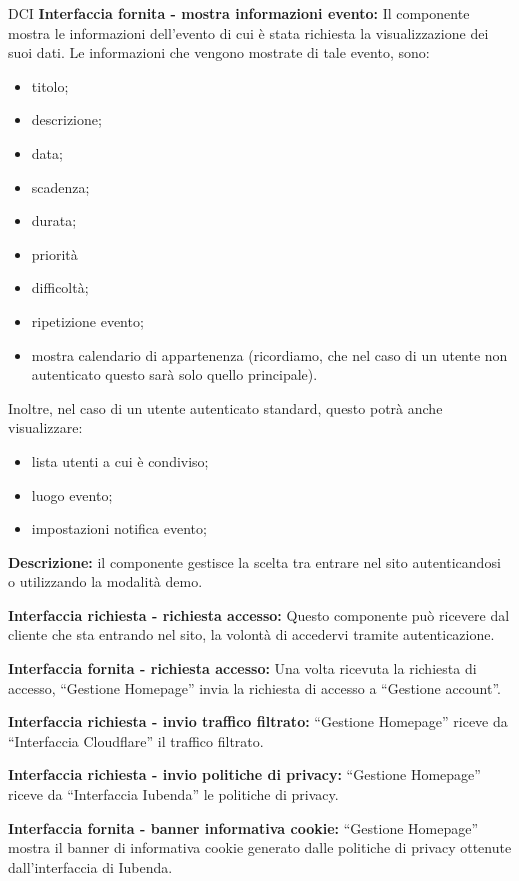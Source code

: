 \begin{listaPersonale}{DCI}
    \textbf{Interfaccia fornita - mostra informazioni evento:} Il componente mostra le informazioni dell'evento di cui è stata richiesta la visualizzazione dei suoi dati. Le informazioni che vengono mostrate di tale evento, sono:
    \begin{itemize}
        \item titolo;
        \item descrizione;
        \item data;
        \item scadenza;
        \item durata;
        \item priorità
        \item difficoltà;
        \item ripetizione evento;
        \item mostra calendario di appartenenza (ricordiamo, che nel caso di un utente non autenticato questo sarà solo quello principale).
    \end{itemize}
    Inoltre, nel caso di un utente autenticato standard, questo potrà anche visualizzare:
    \begin{itemize}
        \item lista utenti a cui è condiviso;
        \item luogo evento;
        \item impostazioni notifica evento;
    \end{itemize}



    \textbf{Descrizione:} il componente gestisce la scelta tra entrare nel sito autenticandosi o utilizzando la modalità demo.

    \textbf{Interfaccia richiesta - richiesta accesso:} Questo componente può ricevere dal cliente che sta entrando nel sito, la volontà di accedervi tramite autenticazione.

    \textbf{Interfaccia fornita - richiesta accesso:} Una volta ricevuta la richiesta di accesso, “Gestione Homepage” invia la richiesta di accesso a “Gestione account”.

    \textbf{Interfaccia richiesta - invio traffico filtrato:} “Gestione Homepage” riceve da “Interfaccia Cloudflare” il traffico filtrato.

    \textbf{Interfaccia richiesta - invio politiche di privacy:} “Gestione Homepage” riceve da “Interfaccia Iubenda” le politiche di privacy.

    \textbf{Interfaccia fornita - banner informativa cookie:} “Gestione Homepage” mostra il banner di informativa cookie generato dalle politiche di privacy ottenute dall'interfaccia di Iubenda.


\end{listaPersonale}
